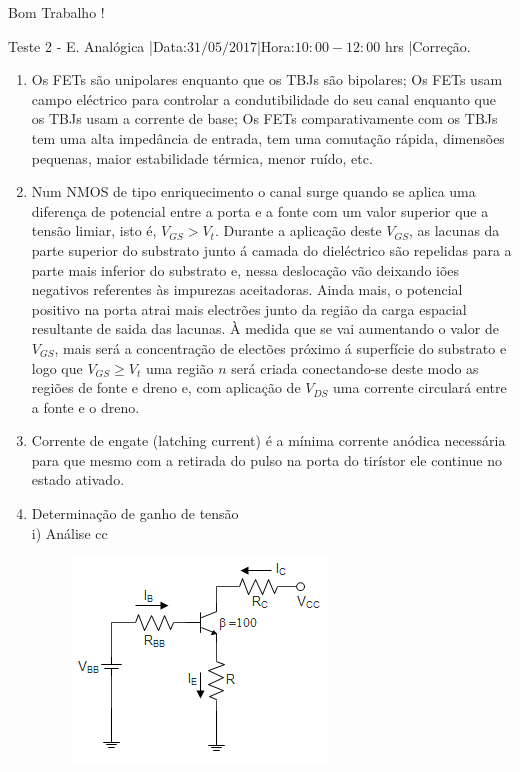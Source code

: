 \documentclass[11pt,a4paper,twoside]{report}
\begin{document}
\vspace{1.5cm}

\huge{Bom Trabalho !}

\newpage
\normalsize
 Teste 2 - E. Anal\'ogica\hspace{0.25cm} |Data:$31/05/2017$\hspace{0.25cm}|Hora:$10:00-12:00$ hrs |Corre\c c\~ao.\\
\hrulefill
\begin{enumerate}
\item Os FETs s\~ao unipolares enquanto que os TBJs s\~ao bipolares; Os FETs usam campo el\'ectrico para controlar a condutibilidade do seu canal enquanto que os TBJs usam a corrente de base; Os FETs comparativamente com os TBJs tem uma alta imped\^ancia de entrada, tem uma comuta\c c\~ao r\'apida, dimens\~oes pequenas, maior estabilidade t\'ermica, menor ru\'ido, etc. 
\item Num NMOS de tipo enriquecimento o canal surge quando se aplica uma diferen\c ca de potencial entre a porta e a fonte com um valor superior que a tens\~ao limiar, isto \'e, $V_{GS}>V_t$. Durante a aplica\c c\~ao deste $V_{GS}$, as lacunas da parte superior do substrato junto \'a camada do diel\'ectrico s\~ao repelidas para a parte mais inferior do substrato e, nessa desloca\c c\~ao v\~ao deixando i\~oes negativos referentes \`as impurezas aceitadoras. Ainda mais, o potencial positivo na porta atrai mais electr\~oes junto da regi\~ao da carga espacial resultante de saida das lacunas. \`A medida que se vai aumentando o valor de $V_{GS}$, mais ser\'a a concentra\c c\~ao de elect\~oes pr\'oximo \'a superf\'icie do substrato e logo que $V_{GS}\geq V_t$ uma região $n$ ser\'a criada  conectando-se deste modo  as  regiões  de  fonte  e  dreno e, com aplica\c c\~ao de $V_{DS}$ uma corrente circular\'a entre a fonte e o dreno. 
\item Corrente de engate (latching current) \'e a m\'inima corrente an\'odica necess\'aria para que mesmo com a retirada do pulso na porta do tir\'istor ele continue no estado ativado.  
\item Determina\c c\~ao de ganho de tens\~ao\\
\noindent
i) An\'alise cc\\
\begin{minipage}[c]{2.5cm}
\begin{figure}[H]
\centering
\includegraphics[scale=0.8]{analisecc}

\end{figure}
\end{minipage}
\end{enumerate}
\end{document}
